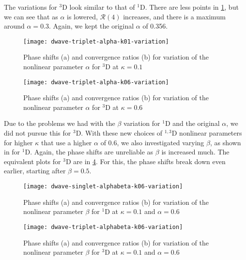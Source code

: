 \documentclass[Dissertation.tex]{subfiles}
\begin{document}
The variations for $^3$D look similar to that of $^1$D. There are less points
in \cref{fig:dwave-triplet-alpha-k01-variation}, but we can see that as
$\alpha$ is lowered, $\mathcal{R}(4)$ increases, and there is a maximum around
$\alpha = 0.3$. Again, we kept the original $\alpha$ of 0.356.

\begin{figure}
	\centering
	\texttt{[image: dwave-triplet-alpha-k01-variation]}
	\caption[Variation of the nonlinear parameter $\alpha$ for $^{3}$D at $\kappa = 0.1$]{Phase shifts (a) and convergence ratios (b) for variation of the nonlinear parameter $\alpha$ for $^{3}$D at $\kappa = 0.1$}
	\label{fig:dwave-triplet-alpha-k01-variation}
\end{figure}



\begin{figure}
	\centering
	\texttt{[image: dwave-triplet-alpha-k06-variation]}
	\caption[Variation of the nonlinear parameter $\alpha$ for $^{3}$D at $\kappa = 0.6$]{Phase shifts (a) and convergence ratios (b) for variation of the nonlinear parameter $\alpha$ for $^{3}$D at $\kappa = 0.6$}
	\label{fig:dwave-triplet-alpha-k06-variation}
\end{figure}

Due to the problems we had with the $\beta$ variation for $^1$D
and the original $\alpha$, we did not pursue this for $^3$D.
With these new choices of $^{1,3}$D nonlinear parameters for higher $\kappa$
that use a higher $\alpha$ of 0.6, we also investigated varying $\beta$, as
shown in  for $^1$D.
Again, the phase shifts are unreliable as $\beta$ is increased much.
The equivalent plots for $^3$D are in \cref{fig:dwave-triplet-alphabeta-k06-variation}.
For this, the phase shifts break down even earlier, starting after $\beta = 0.5$.

\begin{figure}
	\centering
	\texttt{[image: dwave-singlet-alphabeta-k06-variation]}
	\caption[Variation of the nonlinear parameter $\beta$ for $^{1}$D at $\kappa = 0.1$ and $\alpha = 0.6$]{Phase shifts (a) and convergence ratios (b) for variation of the nonlinear parameter $\beta$ for $^{1}$D at $\kappa = 0.1$ and $\alpha = 0.6$}
	\label{fig:dwave-singlet-alphabeta-k06-variation}
\end{figure}

\begin{figure}
	\centering
	\texttt{[image: dwave-triplet-alphabeta-k06-variation]}
	\caption[Variation of the nonlinear parameter $\beta$ for $^{3}$D at $\kappa = 0.1$ and $\alpha = 0.6$]{Phase shifts (a) and convergence ratios (b) for variation of the nonlinear parameter $\beta$ for $^{3}$D at $\kappa = 0.1$ and $\alpha = 0.6$}
	\label{fig:dwave-triplet-alphabeta-k06-variation}
\end{figure}
\end{document}
